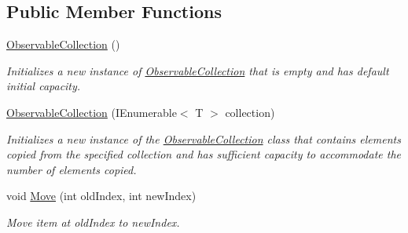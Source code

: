 \subsection*{Public Member Functions}
\begin{DoxyCompactItemize}
\item 
\hyperlink{class_system_1_1_collections_1_1_object_model_1_1_observable_collection_ab754865fa624829ded1806c558d80369}{Observable\+Collection} ()
\begin{DoxyCompactList}\small\item\em Initializes a new instance of \hyperlink{class_system_1_1_collections_1_1_object_model_1_1_observable_collection}{Observable\+Collection} that is empty and has default initial capacity. \end{DoxyCompactList}\item 
\hyperlink{class_system_1_1_collections_1_1_object_model_1_1_observable_collection_a899061b5cae416da03e015f44966f1ad}{Observable\+Collection} (I\+Enumerable$<$ T $>$ collection)
\begin{DoxyCompactList}\small\item\em Initializes a new instance of the \hyperlink{class_system_1_1_collections_1_1_object_model_1_1_observable_collection}{Observable\+Collection} class that contains elements copied from the specified collection and has sufficient capacity to accommodate the number of elements copied. \end{DoxyCompactList}\item 
void \hyperlink{class_system_1_1_collections_1_1_object_model_1_1_observable_collection_a15feef0acd33526bece93362d784d53b}{Move} (int old\+Index, int new\+Index)
\begin{DoxyCompactList}\small\item\em Move item at old\+Index to new\+Index. \end{DoxyCompactList}\end{DoxyCompactItemize}
